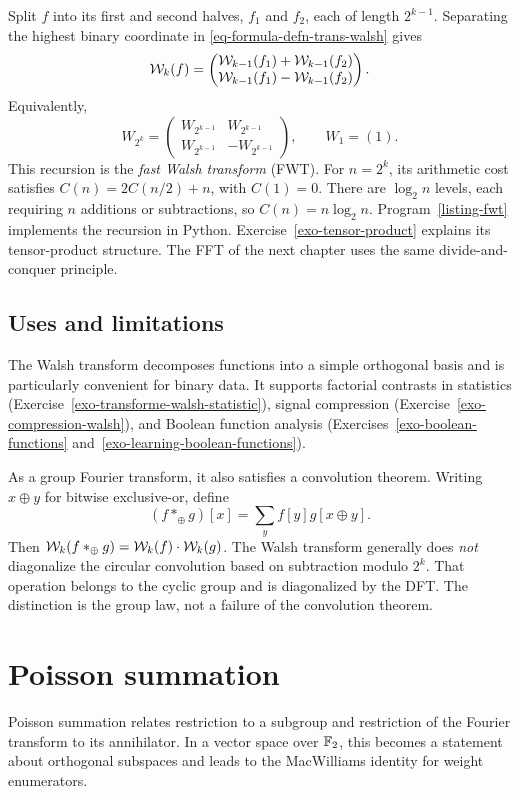Split $f$ into its first and second halves, $f_1$ and $f_2$, each of length
$2^{k-1}$. Separating the highest binary coordinate in
\eqref{eq-formula-defn-trans-walsh} gives
\[
 \mathcal{W}_k(f)=
 \begin{pmatrix}
 \mathcal{W}_{k-1}(f_1)+\mathcal{W}_{k-1}(f_2)\\
 \mathcal{W}_{k-1}(f_1)-\mathcal{W}_{k-1}(f_2)
 \end{pmatrix}.
\]
Equivalently,
\[
 W_{2^k}=
 \begin{pmatrix}W_{2^{k-1}}&W_{2^{k-1}}\\
                 W_{2^{k-1}}&-W_{2^{k-1}}\end{pmatrix},\qquad W_1=(1).
\]
This recursion is the \emph{fast Walsh transform} (FWT). For $n=2^k$,
its arithmetic cost satisfies $C(n)=2C(n/2)+n$, with $C(1)=0$.
There are $\log_2n$ levels, each requiring $n$ additions or subtractions,
so $C(n)=n\log_2n$. Program~\ref{listing-fwt} implements the recursion in
Python. Exercise~\ref{exo-tensor-product} explains its tensor-product structure.
The FFT of the next chapter uses the same divide-and-conquer principle.

\subsection{Uses and limitations}
\label{sect2-use-fwt}
The Walsh transform decomposes functions into a simple orthogonal basis and
is particularly convenient for binary data. It supports factorial contrasts
in statistics (Exercise~\ref{exo-transforme-walsh-statistic}), signal
compression (Exercise~\ref{exo-compression-walsh}), and Boolean function
analysis (Exercises~\ref{exo-boolean-functions} and~\ref{exo-learning-boolean-functions}).

As a group Fourier transform, it also satisfies a convolution theorem.
Writing $x\oplus y$ for bitwise exclusive-or, define
\[
 (f*_\oplus g)[x]=\sum_y f[y]g[x\oplus y].
\]
Then $\mathcal{W}_k(f*_\oplus g)=\mathcal{W}_k(f)\cdot\mathcal{W}_k(g)$.
The Walsh transform generally does \emph{not} diagonalize the circular
convolution based on subtraction modulo $2^k$. That operation belongs to
the cyclic group and is diagonalized by the DFT. The distinction is the group
law, not a failure of the convolution theorem.

\section{Poisson summation}
\label{sect1-fish-formula}
Poisson summation relates restriction to a subgroup and restriction of the
Fourier transform to its annihilator. In a vector space over $\mathbb{F}_2$, this
becomes a statement about orthogonal subspaces and leads to the MacWilliams
identity for weight enumerators.

